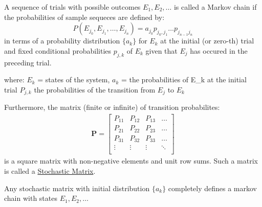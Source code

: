 
\begin{definition}
A sequence of trials with possible outcomes $E_1, E_2, \dots$ is called a Markov chain if the probabilities of sample sequeces are defined by: 
$$ P(E_{j_0}, E_{j_1}, \dots , E_{j_n}) = a_{j_0}p_{j_0, j_1} \dots p_{j_{n-1} j_n}$$ in terms of a probability distribution $\{a_k\}$ for $E_k$ at the initial (or zero-th) trial and fixed conditional probabilities $p_{j, k}$ of $E_k$ given that $E_j$ has occured in the preceding trial.
\end{definition}
where: $E_k$ = states of the system, $a_k$ = the probabilities of E_k at the initial trial $P_{j, k}$ the probabilities of the transition from $E_j$ to $E_k$

Furthermore, the matrix (finite or infinite) of transition probabilites: 
\begin{align*}
    \mathbf{P} = \begin{bmatrix} 
                    P_{11} & P_{12} & P_{13} & \dots \\
                    P_{21} & P_{22} & P_{23} & \dots \\
                    P_{31} & P_{32} & P_{33} & \dots \\
                    \vdots & \vdots & \vdots & \ddots \\
                \end{bmatrix}
\end{align*}
is a square matrix with non-negative elements and unit row sums. Such a matrix is called a \underline{Stochastic Matrix}.

Any stochastic matrix with initial distribution $\{a_k\}$ completely defines a markov chain with states $E_1, E_2, \dots$